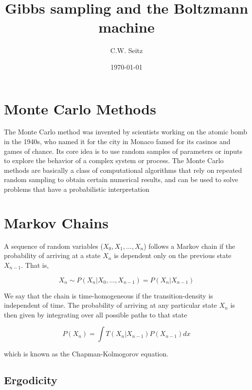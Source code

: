 \documentclass{article}
\title{Gibbs sampling and the Boltzmann machine}
\author{C.W. Seitz}
\date{\today}
\begin{document}
\maketitle

\section{Monte Carlo Methods}

The Monte Carlo method was invented by scientists working on the atomic bomb in the 1940s, who named it for the city in Monaco famed for its casinos and games of chance. Its core idea is to use random samples of parameters or inputs to explore the behavior of a complex system or process. The Monte Carlo methods are basically a class of computational algorithms that rely on repeated random sampling to obtain certain numerical results, and can be used to solve problems that have a probabilistic interpretation

\section{Markov Chains}

A sequence of random variables ($X_{0}, X_{1}, ..., X_{n}$) follows a Markov chain if the probability of arriving at a state $X_{n}$ is dependent only on the previous state $X_{n-1}$. That is, 

\begin{equation}
X_{n} \sim P(X_{n} | X_{0} ,..., X_{n-1}) = P(X_{n}|X_{n-1})
\end{equation} 

We say that the chain is time-homogeneous if the transition-density is independent of time. The probability of arriving at any particular state $X_{n}$ is then given by integrating over all possible paths to that state

\begin{equation}
P(X_{n}) = \int T(X_{n}| X_{n-1})P(X_{n-1})dx
\end{equation} 

which is known as the Chapman-Kolmogorov equation.

\subsection{Ergodicity}
\end{document}
